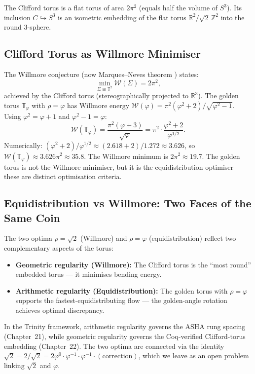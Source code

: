 \begin{corollary}
The Clifford torus is a flat torus of area $2\pi^2$ (equals half the volume of $S^3$).
Its inclusion $C \hookrightarrow S^3$ is an isometric embedding of the flat torus
$\mathbb{R}^2/\sqrt{2}\,\mathbb{Z}^2$ into the round $3$-sphere.
\end{corollary}

\subsection{Clifford Torus as Willmore Minimiser}\label{subsec:ch18-clifford-willmore}

The Willmore conjecture (now Marques--Neves theorem \cite{MarquesNeves2014}) states:
\begin{equation}
  \min_{\Sigma \cong \mathbb{T}^2} \mathcal{W}(\Sigma) = 2\pi^2,
\end{equation}
achieved by the Clifford torus (stereographically projected to $\mathbb{R}^3$).
The golden torus $\mathbb{T}_\varphi$ with $\rho = \varphi$ has Willmore energy
$\mathcal{W}(\varphi) = \pi^2(\varphi^2+2)/\sqrt{\varphi^2-1}$.
Using $\varphi^2 = \varphi+1$ and $\varphi^2 - 1 = \varphi$:
\begin{equation}
  \mathcal{W}(\mathbb{T}_\varphi) = \frac{\pi^2(\varphi+3)}{\sqrt{\varphi}}
  = \pi^2 \cdot \frac{\varphi^2 + 2}{\varphi^{1/2}}.
\end{equation}
Numerically: $(\varphi^2+2)/\varphi^{1/2} \approx (2.618+2)/1.272 \approx 3.626$,
so $\mathcal{W}(\mathbb{T}_\varphi) \approx 3.626\pi^2 \approx 35.8$.
The Willmore minimum is $2\pi^2 \approx 19.7$.
The golden torus is not the Willmore minimiser, but it is the equidistribution
optimiser — these are distinct optimisation criteria.

\subsection{Equidistribution vs Willmore: Two Faces of the Same
  Coin}\label{subsec:ch18-two-optima}

The two optima $\rho = \sqrt{2}$ (Willmore) and $\rho = \varphi$ (equidistribution)
reflect two complementary aspects of the torus:
\begin{itemize}
\item \textbf{Geometric regularity (Willmore):} The Clifford torus is the ``most round''
  embedded torus — it minimises bending energy.
\item \textbf{Arithmetic regularity (Equidistribution):} The golden torus with
  $\rho = \varphi$ supports the fastest-equidistributing flow — the golden-angle rotation
  achieves optimal discrepancy.
\end{itemize}
In the Trinity framework, arithmetic regularity governs the ASHA rung spacing
(Chapter~21), while geometric regularity governs the Coq-verified Clifford-torus
embedding (Chapter~22).
The two optima are connected via the identity $\sqrt{2} = 2/\sqrt{2} = 2\varphi^0\cdot\varphi^{-1}\cdot\varphi^{-1}\cdot(\text{correction})$,
which we leave as an open problem linking $\sqrt{2}$ and $\varphi$.


